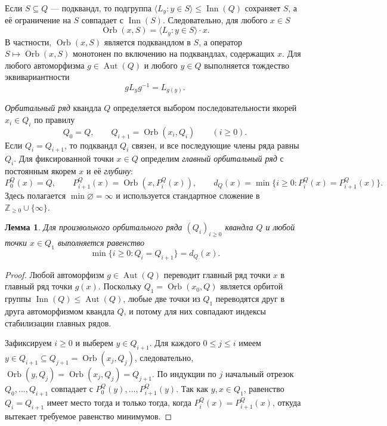 \documentclass[11pt,a4paper]{article}
\newtheorem{lemma}[theorem]{Лемма}
\theoremstyle{remark}
\newcommand{\Inn}{\operatorname{Inn}}
\newcommand{\Orb}{\operatorname{Orb}}
\newcommand{\Aut}{\operatorname{Aut}}
\newcommand{\Z}{\mathbb{Z}}
\begin{document}
Если \(S\subseteq Q\) --- подквандл, то подгруппа
\(\langle L_y : y\in S\rangle\le\Inn(Q)\) сохраняет \(S\), а её
ограничение на \(S\) совпадает с \(\Inn(S)\). Следовательно, для любого
\(x\in S\)
\begin{equation}\label{eq:ambient-orbit}
  \Orb(x,S)=\langle L_y : y\in S\rangle\cdot x.
\end{equation}
В частности, \(\Orb(x,S)\) является подквандлом в \(S\), а оператор
\(S\mapsto\Orb(x,S)\) монотонен по включению на подквандлах, содержащих
\(x\). Для любого автоморфизма \(g\in\Aut(Q)\) и любого \(y\in Q\)
выполняется тождество эквивариантности
\begin{equation}\label{eq:equivariance}
  gL_yg^{-1}=L_{g(y)}.
\end{equation}

\emph{Орбитальный ряд} квандла \(Q\) определяется выбором последовательности
якорей \(x_i\in Q_i\) по правилу
\[
  Q_0=Q,\qquad Q_{i+1}=\Orb(x_i,Q_i)\qquad(i\ge 0).
\]
Если \(Q_i=Q_{i+1}\), то подквандл \(Q_i\) связен, и все последующие
члены ряда равны \(Q_i\). Для фиксированной точки \(x\in Q\) определим
\emph{главный орбитальный ряд} с постоянным якорем \(x\) и её
\emph{глубину}:
\[
  P_0^Q(x)=Q,\qquad P_{i+1}^Q(x)=\Orb(x,P_i^Q(x)),\qquad
  d_Q(x)=\min\{i\ge 0 : P_i^Q(x)=P_{i+1}^Q(x)\}.
\]
Здесь полагается \(\min\varnothing=\infty\) и используется стандартное
сложение в \(\Z_{\ge 0}\cup\{\infty\}\).

\begin{lemma}\label{lem:principal}
Для произвольного орбитального ряда \((Q_i)_{i\ge 0}\) квандла \(Q\) и
любой точки \(x\in Q_1\) выполняется равенство
\[
  \min\{i\ge 0 : Q_i=Q_{i+1}\}=d_Q(x).
\]
\end{lemma}

\begin{proof}
Любой автоморфизм \(g\in\Aut(Q)\) переводит главный ряд точки \(x\) в
главный ряд точки \(g(x)\). Поскольку \(Q_1=\Orb(x_0,Q)\) является
орбитой группы \(\Inn(Q)\le\Aut(Q)\), любые две точки из \(Q_1\)
переводятся друг в друга автоморфизмом квандла \(Q\), и потому для них
совпадают индексы стабилизации главных рядов.

Зафиксируем \(i\ge 0\) и выберем \(y\in Q_{i+1}\). Для каждого
\(0\le j\le i\) имеем \(y\in Q_{i+1}\subseteq Q_{j+1}=\Orb(x_j,Q_j)\),
следовательно, \(\Orb(y,Q_j)=\Orb(x_j,Q_j)=Q_{j+1}\). По индукции по
\(j\) начальный отрезок \(Q_0,\dots,Q_{i+1}\) совпадает с
\(P_0^Q(y),\dots,P_{i+1}^Q(y)\). Так как \(y,x\in Q_1\), равенство
\(Q_i=Q_{i+1}\) имеет место тогда и только тогда, когда
\(P_i^Q(x)=P_{i+1}^Q(x)\), откуда вытекает требуемое равенство минимумов.
\end{proof}
\end{document}
